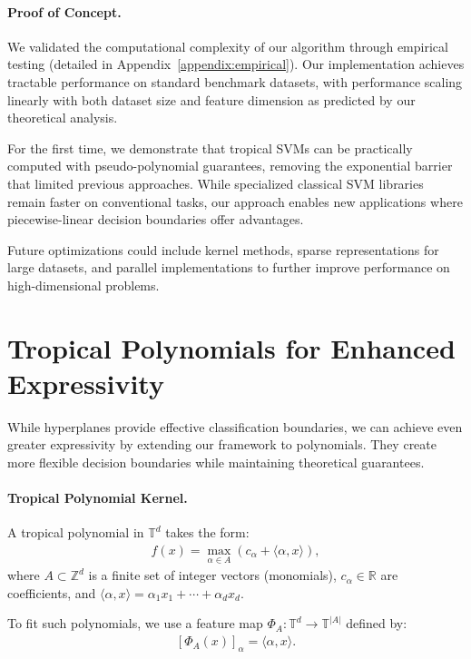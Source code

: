 \documentclass{article}
\newcommand{\R}{\mathbb{R}}
\newcommand{\trop}{\mathbb{T}}
\begin{document}
\paragraph{Proof of Concept.}
We validated the computational complexity of our algorithm through empirical testing (detailed in Appendix~\ref{appendix:empirical}). Our implementation achieves tractable performance on standard benchmark datasets, with performance scaling linearly with both dataset size and feature dimension as predicted by our theoretical analysis.

For the first time, we demonstrate that tropical SVMs can be practically computed with pseudo-polynomial guarantees, removing the exponential barrier that limited previous approaches. While specialized classical SVM libraries remain faster on conventional tasks, our approach enables new applications where piecewise-linear decision boundaries offer advantages.

Future optimizations could include kernel methods, sparse representations for large datasets, and parallel implementations to further improve performance on high-dimensional problems.

\section{Tropical Polynomials for Enhanced Expressivity}\label{sec:polynomials}

While hyperplanes provide effective classification boundaries, we can achieve even greater expressivity by extending our framework to polynomials. They create more flexible decision boundaries while maintaining theoretical guarantees.

\paragraph{Tropical Polynomial Kernel.}
A tropical polynomial in $\trop^d$ takes the form:
\begin{align}
f(x) = \max_{\alpha \in A} (c_\alpha + \langle \alpha, x \rangle),
\end{align}
where $A \subset \mathbb{Z}^d$ is a finite set of integer vectors (monomials), $c_\alpha \in \R$ are coefficients, and $\langle \alpha, x \rangle = \alpha_1 x_1 + \cdots + \alpha_d x_d$.

To fit such polynomials, we use a feature map $\Phi_A: \trop^d \to \trop^{|A|}$ defined by:
\begin{align}\label{e-def-feature}
[\Phi_A(x)]_\alpha = \langle \alpha, x \rangle.
\end{align}
\end{document}
